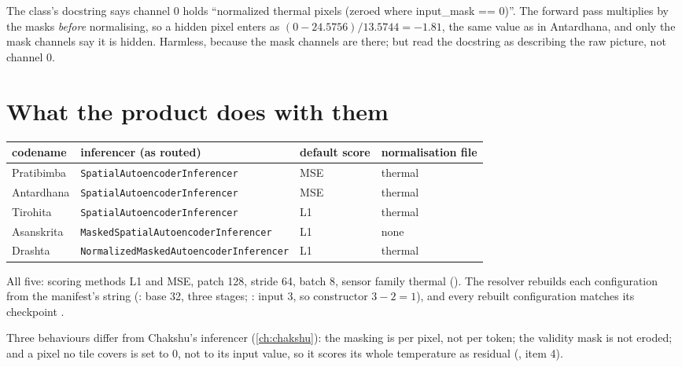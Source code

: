\begin{sourcenote}
The class's docstring says channel 0 holds ``normalized thermal pixels (zeroed where input\_mask == 0)''. The forward
pass multiplies by the masks \emph{before} normalising, so a hidden pixel enters as $(0-24.5756)/13.5744=-1.81$, the
same value as in Antardhana, and only the mask channels say it is hidden. Harmless, because the mask channels are
there; but read the docstring as describing the raw picture, not channel 0.
\end{sourcenote}

\section{What the product does with them}\label{sec:convae:product}

\begin{center}\small
\begin{tabular}{@{}llll@{}}
\toprule
codename & inferencer (as routed) & default score & normalisation file\\
\midrule
Pratibimba & \texttt{SpatialAutoencoderInferencer} & MSE & thermal\\
Antardhana & \texttt{SpatialAutoencoderInferencer} & MSE & thermal\\
Tirohita & \texttt{SpatialAutoencoderInferencer} & L1 & thermal\\
Asanskrita & \texttt{MaskedSpatialAutoencoderInferencer} & L1 & none\\
Drashta & \texttt{NormalizedMaskedAutoencoderInferencer} & L1 & thermal\\
\bottomrule
\end{tabular}
\end{center}
All five: scoring methods L1 and MSE, patch 128, stride 64, batch 8, sensor family thermal
(). The resolver rebuilds each configuration from the manifest's
 string (: base 32, three stages; : input 3, so constructor
 $3-2=1$), and every rebuilt configuration matches its checkpoint \tagC.

Three behaviours differ from Chakshu's inferencer (\cref{ch:chakshu}): the masking is per pixel, not per token; the
validity mask is not eroded; and a pixel no tile covers is set to 0, not to its input value, so it scores its whole
temperature as residual (, item 4).

